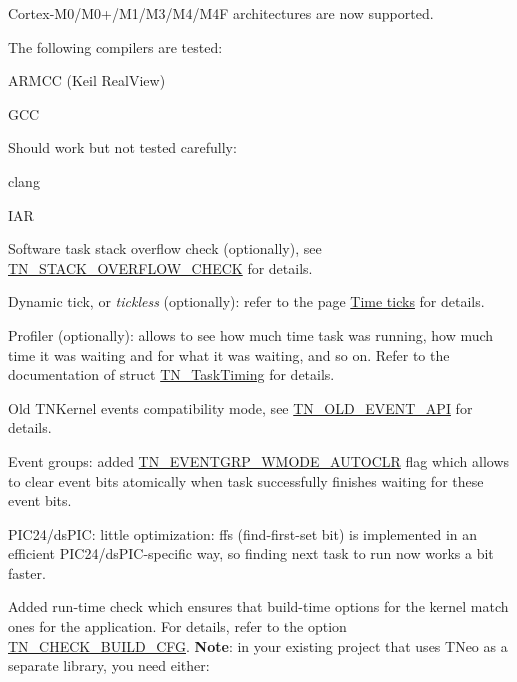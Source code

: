 \begin{DoxyItemize}
\item Cortex-\/\+M0/\+M0+/\+M1/\+M3/\+M4/\+M4F architectures are now supported.
\begin{DoxyItemize}
\item The following compilers are tested\+:
\begin{DoxyItemize}
\item A\+R\+M\+CC (Keil Real\+View)
\item G\+CC
\end{DoxyItemize}
\item Should work but not tested carefully\+:
\begin{DoxyItemize}
\item clang
\item I\+AR
\end{DoxyItemize}
\end{DoxyItemize}
\item Software task stack overflow check (optionally), see {\ttfamily \hyperlink{tn__cfg__default_8h_ac6a9bbac3b3b25d9b5bc8c21d2e09955}{T\+N\+\_\+\+S\+T\+A\+C\+K\+\_\+\+O\+V\+E\+R\+F\+L\+O\+W\+\_\+\+C\+H\+E\+CK}} for details.
\item Dynamic tick, or {\itshape tickless} (optionally)\+: refer to the page \hyperlink{time_ticks}{Time ticks} for details.
\item Profiler (optionally)\+: allows to see how much time task was running, how much time it was waiting and for what it was waiting, and so on. Refer to the documentation of {\ttfamily struct \hyperlink{structTN__TaskTiming}{T\+N\+\_\+\+Task\+Timing}} for details.
\item Old T\+N\+Kernel events compatibility mode, see {\ttfamily \hyperlink{tn__cfg__default_8h_ac61d5f6a716cdcab205a2c8afbde4242}{T\+N\+\_\+\+O\+L\+D\+\_\+\+E\+V\+E\+N\+T\+\_\+\+A\+PI}} for details.
\item Event groups\+: added {\ttfamily \hyperlink{tn__eventgrp_8h_a9d42ee61ae8da342f1cd6440b7e54bbdaf45098235d31f72a2b09e30792686573}{T\+N\+\_\+\+E\+V\+E\+N\+T\+G\+R\+P\+\_\+\+W\+M\+O\+D\+E\+\_\+\+A\+U\+T\+O\+C\+LR}} flag which allows to clear event bits atomically when task successfully finishes waiting for these event bits.
\item P\+I\+C24/ds\+P\+IC\+: little optimization\+: ffs (find-\/first-\/set bit) is implemented in an efficient P\+I\+C24/ds\+P\+I\+C-\/specific way, so finding next task to run now works a bit faster.
\item Added run-\/time check which ensures that build-\/time options for the kernel match ones for the application. For details, refer to the option {\ttfamily \hyperlink{tn__cfg__default_8h_aacdc913eb66492cf69cf02a5de73578e}{T\+N\+\_\+\+C\+H\+E\+C\+K\+\_\+\+B\+U\+I\+L\+D\+\_\+\+C\+FG}}. {\bfseries Note}\+: in your existing project that uses T\+Neo as a separate library, you need either\+:

\end{DoxyItemize}
